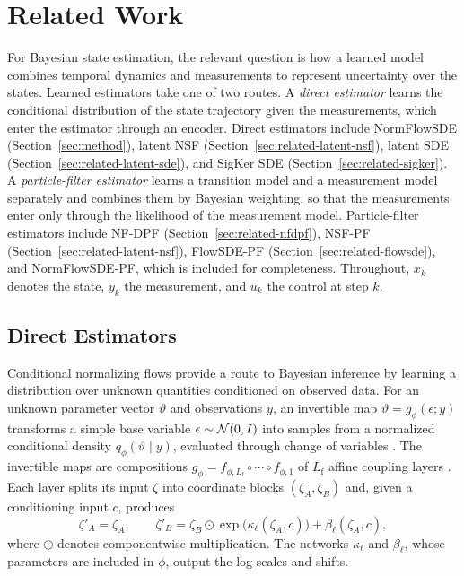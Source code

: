 \section{Related Work}\label{sec:related}
For Bayesian state estimation, the relevant question is how a learned model combines temporal dynamics and measurements to represent uncertainty over the states. Learned estimators take one of two routes. A \emph{direct estimator} learns the conditional distribution of the state trajectory given the measurements, which enter the estimator through an encoder. Direct estimators include NormFlowSDE (Section~\ref{sec:method}), latent NSF (Section~\ref{sec:related-latent-nsf}), latent SDE (Section~\ref{sec:related-latent-sde}), and SigKer SDE (Section~\ref{sec:related-sigker}). A \emph{particle-filter estimator} learns a transition model and a measurement model separately and combines them by Bayesian weighting, so that the measurements enter only through the likelihood of the measurement model. Particle-filter estimators include NF-DPF (Section~\ref{sec:related-nfdpf}), NSF-PF (Section~\ref{sec:related-latent-nsf}), FlowSDE-PF (Section~\ref{sec:related-flowsde}), and NormFlowSDE-PF, which is included for completeness. Throughout, $x_k$ denotes the state, $y_k$ the measurement, and $u_k$ the control at step $k$.

\subsection{Direct Estimators}\label{sec:related-direct}
Conditional normalizing flows provide a route to Bayesian inference by learning a distribution over unknown quantities conditioned on observed data. For an unknown parameter vector $\vartheta$ and observations $y$, an invertible map $\vartheta=g_\phi(\epsilon;y)$ transforms a simple base variable $\epsilon\sim\mathcal N(0,I)$ into samples from a normalized conditional density $q_\phi(\vartheta\mid y)$, evaluated through change of variables \citep{dinh2014nice,rezende2015flows}. The invertible maps are compositions $g_\phi=f_{\phi,L_{\mathrm f}}\circ\cdots\circ f_{\phi,1}$ of $L_{\mathrm f}$ affine coupling layers \citep{dinh2017realnvp}. Each layer splits its input $\zeta$ into coordinate blocks $(\zeta_A,\zeta_B)$ and, given a conditioning input $c$, produces
\begin{equation}\label{eq:affine-coupling}
 \zeta'_A=\zeta_A,\qquad
 \zeta'_B=\zeta_B\odot\exp\bigl(\kappa_\ell(\zeta_A,c)\bigr)+\beta_\ell(\zeta_A,c),
\end{equation}
where $\odot$ denotes componentwise multiplication. The networks $\kappa_\ell$ and $\beta_\ell$, whose parameters are included in $\phi$, output the log scales and shifts.

